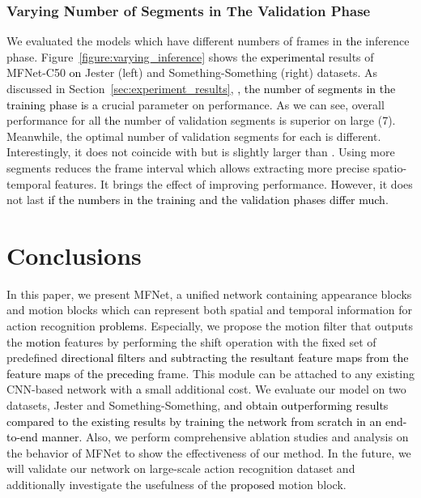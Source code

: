 \documentclass[runningheads]{llncs}
\newcommand{\nj}[1]{\textcolor{black}{#1}}
\begin{document}
\subsubsection{Varying Number of Segments in The Validation Phase}
We evaluated the models which have different numbers of frames in \nj{the} inference phase. Figure~\ref{figure:varying_inference} shows the \nj{experimental} results of MFNet-C50 \nj{on} Jester (left) and Something-Something (right) datasets. As discussed in Section~\ref{sec:experiment_results}, \nj{, the number of segments in the training phase is a} crucial parameter on performance. As we can see, overall performance for all \nj{the} number of validation segments is superior on large  (7). Meanwhile, the optimal number of validation segments for each  is different. Interestingly, it does not coincide with  but is slightly larger than .
Using more segments reduces the frame interval which allows extracting more precise spatio-temporal features. It brings the effect of improving performance. However, it does not last \nj{if the numbers in the training and the validation phases differ much}.

\section{Conclusions}
\label{sec:con}
In this paper, we present MFNet, a unified network containing appearance blocks and motion blocks which can represent both spatial and temporal information for action recognition \nj{problems}. Especially, we propose the motion filter that outputs the \nj{motion} features by performing the shift operation with the fixed set of predefined \nj{directional filters and subtracting the resultant feature maps from the feature maps} of \nj{the preceding} frame. This module can be attached to any existing CNN-based network with \nj{a} small additional cost. We evaluate our model on two datasets, Jester and Something-Something, \nj{and obtain outperforming results compared to the existing results by training the network from scratch in an end-to-end manner}. Also, we perform comprehensive ablation studies and analysis on the behavior of MFNet to show the effectiveness of our method. In the future, we will validate our network on large-scale action recognition dataset and additionally investigate the usefulness of the \nj{proposed} motion block. 



\end{document}
